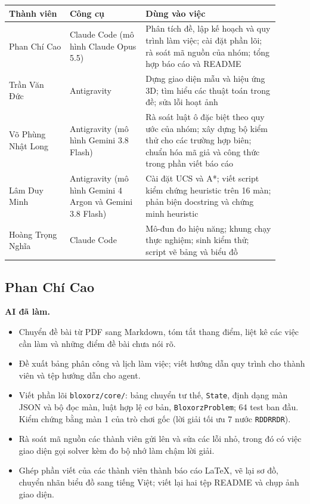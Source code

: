 {\renewcommand{\arraystretch}{1.25}
\begin{longtable}{|>{\raggedright\arraybackslash}p{0.2\linewidth}|>{\raggedright\arraybackslash}p{0.25\linewidth}|>{\raggedright\arraybackslash}p{0.445\linewidth}|}
\hline
\textbf{Thành viên} & \textbf{Công cụ} & \textbf{Dùng vào việc} \\ \hline
\endhead
\hline
\endlastfoot
Phan Chí Cao & Claude Code (mô hình Claude Opus 5.5) & Phân tích đề, lập kế hoạch và quy trình làm việc; cài đặt phần lõi; rà soát mã nguồn của nhóm; tổng hợp báo cáo và README \\ \hline
Trần Văn Đức & Antigravity & Dựng giao diện mẫu và hiệu ứng 3D; tìm hiểu các thuật toán trong đề; sửa lỗi hoạt ảnh \\ \hline
Võ Phùng Nhật Long & Antigravity (mô hình Gemini 3.8 Flash) & Rà soát luật ô đặc biệt theo quy ước của nhóm; xây dựng bộ kiểm thử cho các trường hợp biên; chuẩn hóa mã giả và công thức trong phần viết báo cáo \\ \hline
Lâm Duy Minh & Antigravity (mô hình Gemini 4 Argon và Gemini 3.8 Flash) & Cài đặt UCS và A*; viết script kiểm chứng heuristic trên 16 màn; phản biện docstring và chứng minh heuristic \\ \hline
Hoàng Trọng Nghĩa & Claude Code & Mô-đun đo hiệu năng; khung chạy thực nghiệm; sinh kiểm thử; script vẽ bảng và biểu đồ \\
\end{longtable}
}

\subsection*{Phan Chí Cao}

\textbf{AI đã làm.}
\begin{itemize}
\item Chuyển đề bài từ PDF sang Markdown, tóm tắt thang điểm, liệt kê các việc cần làm và những điểm đề bài chưa nói rõ.
\item Đề xuất bảng phân công và lịch làm việc; viết hướng dẫn quy trình cho thành viên và tệp hướng dẫn cho agent.
\item Viết phần lõi \texttt{bloxorz/core/}: bảng chuyển tư thế, \texttt{State}, định dạng màn JSON và bộ đọc màn, luật hợp lệ cơ bản, \texttt{BloxorzProblem}; 64 test ban đầu. Kiểm chứng bằng màn 1 của trò chơi gốc (lời giải tối ưu 7 nước \texttt{RDDRRDR}).
\item Rà soát mã nguồn các thành viên gửi lên và sửa các lỗi nhỏ, trong đó có việc giao diện gọi solver kèm đo bộ nhớ làm chậm lời giải.
\item Ghép phần viết của các thành viên thành báo cáo \LaTeX{}, vẽ lại sơ đồ, chuyển nhãn biểu đồ sang tiếng Việt; viết lại hai tệp README và chụp ảnh giao diện.
\end{itemize}

